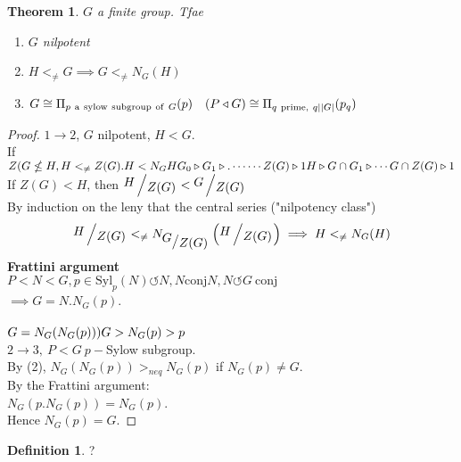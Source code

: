 \documentclass{article}
\let\ddd\cdots
\newcommand{\quotient}[2]{{\raisebox{.2em}{$#1$}\left/\raisebox{-.2em}{$#2$}\right.}}
\newcommand{\abs}[1]{\left|#1\right|}
\newcommand{\tsubgp}{\triangleleft}
\newcommand{\tsupgp}{\triangleright}
\newtheorem{theorem}{Theorem}[section]
\theoremstyle{definition}
\newtheorem{definition}{Definition}[section]
\theoremstyle{remark}
\theoremstyle{example}
\begin{document}
	\begin{theorem}
		$G$ a finite group. Tfae
		\begin{enumerate}
			\item $G$ nilpotent
			\item $H <_{\neq } G \implies G <_{\neq} N_G(H)$
			\item $G \cong  \Pi_{p\ \mathrm{a\ sylow\ subgroup\ of\ } G} (p)\quad (P \tsubgp G)\\
			\cong \Pi_{q\ \mathrm{prime},\ q \mid \abs{G}}(p_q)$
		\end{enumerate}
	\end{theorem}
	\begin{proof}
		$1 \to 2$, $G$ nilpotent, $H < G$.\\
		If $Z(G \nleq H, H<_{\neq}Z(G).H < N_GH\\
		G_0 \tsupgp G_1 \tsupgp . \ddd \ddd Z(G) \tsupgp 1\\
		H \tsupgp G \cap G_1 \tsupgp \ddd G \cap Z(G) \tsupgp 1$\\
		If $Z(G) < H$, then $\quotient{H}{Z(G)} < \quotient{G}{Z(G)}$\\
		By induction on the leny that the central series ("nilpotency class")
		\[ \quotient{H}{Z(G)} <_{\neq} N_{\quotient{G}{Z(G)}}\left(\quotient{H}{Z(G)}\right) \implies H <_{\neq} N_G(H) \]
		\textbf{Frattini argument}\\
		$P < N < G, p \in \mathrm{Syl}_p(N) \circlearrowleft N, N \mathrm{conj} N, N \circlearrowleft G\  \mathrm{conj}$\\
		$\implies G=N.N_G(p)$.\\\\
		$G=N_G(N_G(p)))\\
		G > N_G(p) > p$\\
		$2 \to 3,\ P<G\ p-$Sylow subgroup.\\
		By (2), $N_G(N_G(p)) >_{neq} N_G(p)$ if $N_G(p) \neq G$.\\
		By the Frattini argument:\\
		$N_G(p.N_G(p))=N_G(p)$.\\
		Hence $N_G(p)=G$.
	\end{proof}

	\begin{definition}
		?
	\end{definition}
\end{document}
